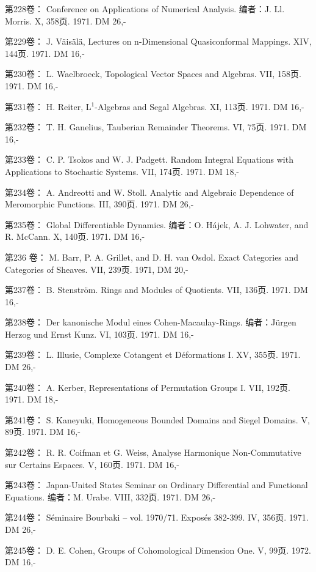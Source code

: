 第228卷： Conference on Applications of Numerical Analysis. 编者：J. Ll. Morris. X, 358页. 1971. DM 26,-

第229卷： J. Väisälä, Lectures on n-Dimensional Quasiconformal Mappings. XIV, 144页. 1971. DM 16,-

第230卷： L. Waelbroeck, Topological Vector Spaces and Algebras. VII, 158页. 1971. DM 16,-

第231卷： H. Reiter, L$^1$-Algebras and Segal Algebras. XI, 113页. 1971. DM 16,-

第232卷： T. H. Ganelius, Tauberian Remainder Theorems. VI, 75页. 1971. DM 16,-

第233卷： C. P. Tsokos and W. J. Padgett. Random Integral Equations with Applications to Stochastic Systems. VII, 174页. 1971. DM 18,-

第234卷： A. Andreotti and W. Stoll. Analytic and Algebraic Dependence of Meromorphic Functions. III, 390页. 1971. DM 26,-

第235卷： Global Differentiable Dynamics. 编者：O. Hájek, A. J. Lohwater, and R. McCann. X, 140页. 1971. DM 16,-

第236 卷： M. Barr, P. A. Grillet, and D. H. van Osdol. Exact Categories and Categories of Sheaves. VII, 239页. 1971, DM 20,-

第237卷： B. Stenström. Rings and Modules of Quotients. VII, 136页. 1971. DM 16,-

第238卷： Der kanonische Modul eines Cohen-Macaulay-Rings. 编者：Jürgen Herzog und Ernst Kunz. VI, 103页. 1971. DM 16,-

第239卷： L. Illusie, Complexe Cotangent et Déformations I. XV, 355页. 1971. DM 26,-

第240卷： A. Kerber, Representations of Permutation Groups I. VII, 192页. 1971. DM 18,-

第241卷： S. Kaneyuki, Homogeneous Bounded Domains and Siegel Domains. V, 89页. 1971. DM 16,-

第242卷： R. R. Coifman et G. Weiss, Analyse Harmonique Non-Commutative sur Certains Espaces. V, 160页. 1971. DM 16,-

第243卷： Japan-United States Seminar on Ordinary Differential and Functional Equations. 编者：M. Urabe. VIII, 332页. 1971. DM 26,-

第244卷： Séminaire Bourbaki -- vol. 1970/71. Exposés 382-399. IV, 356页. 1971. DM 26,-

第245卷： D. E. Cohen, Groups of Cohomological Dimension One. V, 99页. 1972. DM 16,-




